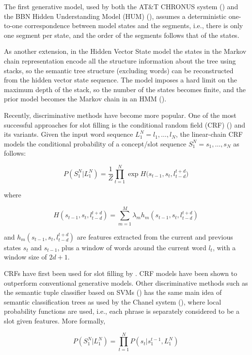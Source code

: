 The first generative model, used by both the AT\&T CHRONUS system (\cite{rnn31}) and the
BBN Hidden Understanding Model (HUM) (\cite{rnn35}), assumes a deterministic one-to-one
correspondence between model states and the segments, i.e., there is only one
segment per state, and the order of the segments follows that of the states.  

As another extension, in the Hidden Vector State model the states in the
Markov chain representation encode all the structure information about the
tree using stacks, so the semantic tree structure (excluding words) can be
reconstructed from the hidden vector state sequence. The model imposes a hard
limit on the maximum depth of the stack, so the number of the states becomes
finite, and the prior model becomes the Markov chain in an HMM (\cite{rnn33}).

Recently, discriminative methods have become more popular. One of the most
successful approaches for slot filling is the conditional random field (CRF)
(\cite{rnn6}) and its variants. Given the input word sequence $L_1^N=l_1,\dots,l_N$, the
linear-chain CRF models the conditional probability of a concept/slot sequence
$S_1^N=s_1,\dots,s_N$ as follows:

\begin{equation}
P(S_{1}^{N}\vert L_{1}^{N}) = \frac{1}{Z}\prod_{t=1}^{N}\exp{H(s_{t-1}, s_{t}, l_{t-d}^{t+d}})
\label{eq:crf1}
\end{equation}

where

\begin{equation}
H(s_{t-1}, s_{t}, l_{t-d}^{t+d}) = \sum_{m=1}^{M}\lambda_{m}h_{m}(s_{t-1}, s_{t}, l_{t-d}^{t+d})
\label{eq:crf2}
\end{equation}

and $h_m (s_{t-1},s_t,l_{t-d}^{t+d})$ are features extracted from the current and
previous states $s_t$ and $s_{t-1}$, plus a window of words around the current word
$l_t$, with a window size of $2d+1$.

CRFs have first been used for slot filling by \cite{rnn33}. CRF
models have been shown to outperform conventional generative models. Other
discriminative methods such as the semantic tuple classifier based on SVMs (\cite{rnn36})
has the same main idea of semantic classification trees as used by the Chanel
system (\cite{rnn37}), where local probability functions are used, i.e., each phrase is
separately considered to be a slot given features. More formally,

\begin{equation}
P(S_{1}^{N}\vert L_{1}^{N}) = \prod_{t=1}^{N} P(s_{t} \vert s_{1}^{t-1}, L_{1}^{N})
\end{equation}

